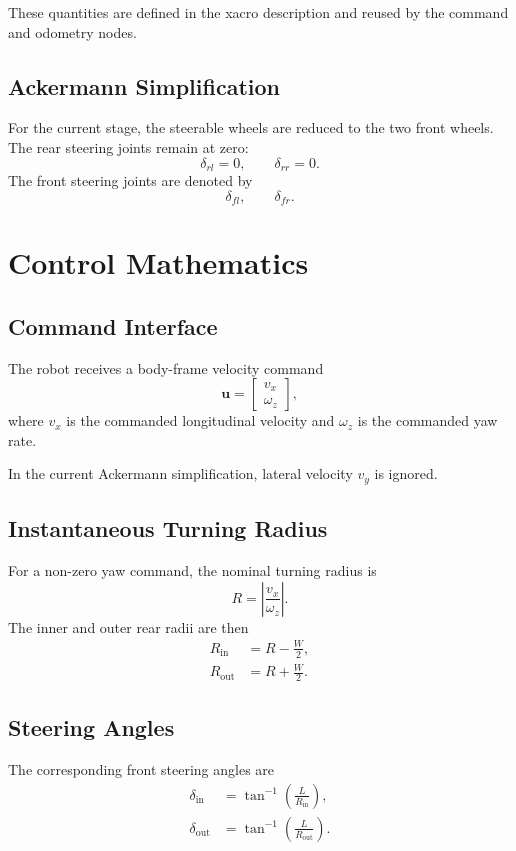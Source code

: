 \documentclass[12pt,a4paper]{report}
\begin{document}
These quantities are defined in the xacro description and reused by the command and odometry nodes.

\section{Ackermann Simplification}
For the current stage, the steerable wheels are reduced to the two front wheels. The rear steering joints remain at zero:
\begin{equation}
\delta_{rl} = 0, \qquad \delta_{rr} = 0.
\end{equation}
The front steering joints are denoted by
\begin{equation}
\delta_{fl}, \qquad \delta_{fr}.
\end{equation}

\chapter{Control Mathematics}

\section{Command Interface}
The robot receives a body-frame velocity command
\begin{equation}
\mathbf{u} =
\begin{bmatrix}
v_x \\
\omega_z
\end{bmatrix},
\end{equation}
where \(v_x\) is the commanded longitudinal velocity and \(\omega_z\) is the commanded yaw rate.

In the current Ackermann simplification, lateral velocity \(v_y\) is ignored.

\section{Instantaneous Turning Radius}
For a non-zero yaw command, the nominal turning radius is
\begin{equation}
R = \left| \frac{v_x}{\omega_z} \right|.
\end{equation}
The inner and outer rear radii are then
\begin{align}
R_{\text{in}} &= R - \frac{W}{2}, \\
R_{\text{out}} &= R + \frac{W}{2}.
\end{align}

\section{Steering Angles}
The corresponding front steering angles are
\begin{align}
\delta_{\text{in}} &= \tan^{-1}\left( \frac{L}{R_{\text{in}}} \right), \\
\delta_{\text{out}} &= \tan^{-1}\left( \frac{L}{R_{\text{out}}} \right).
\end{align}
\end{document}
